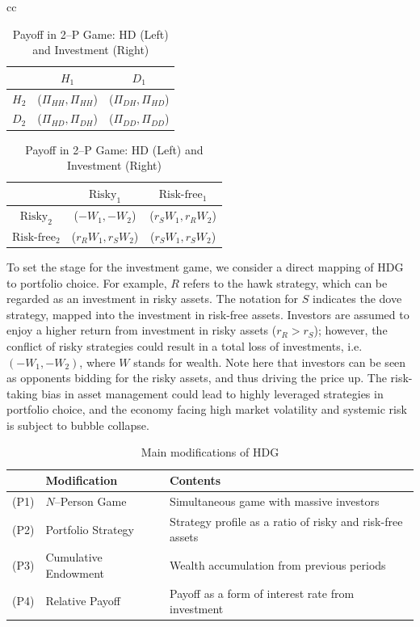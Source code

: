 \documentclass[11pt,a4paper]{article}
\begin{document}
\begin{table}[hbt!]
       \centering
	\caption{Payoff in 2--P Game: HD (Left) and Investment (Right)}
	\begin{tabular}{ cc }   %
		\begin{tabular}{c|cc}
			\toprule
				    & $H_1$ & $D_1$ \\
			\midrule
			$H_2$	& ($\Pi_{HH}, \Pi_{HH}$) & ($\Pi_{DH}, \Pi_{HD}$)\\
			$D_2$	& ($\Pi_{HD}, \Pi_{DH}$) & ($\Pi_{DD},\Pi_{DD}$)\\
			\bottomrule
		\end{tabular} 
		\quad \quad \quad 
		\begin{tabular}{c|cc}
			\toprule
				                & $\mbox{Risky}_1$ & $\mbox{Risk-free}_1$ \\
			\midrule
			$\mbox{Risky}_2$	    & ($-W_{1}, -W_{2}$) & ($r_{S}W_{1}, r_{R}W_{2}$)\\
			$\mbox{Risk-free}_2$	& ($r_{R}W_{1}, r_{S}W_{2}$) & ($r_{S}W_{1}, r_{S}W_{2}$)\\
			\bottomrule
		\end{tabular}
	\end{tabular}
       \label{tab:2p_payoff}
\end{table}

To set the stage for the investment game, we consider a direct mapping of HDG to portfolio choice. For example, $R$ refers to the hawk strategy, which can be regarded as an investment in risky assets. The notation for $S$ indicates the dove strategy, mapped into the investment in risk-free assets. Investors are assumed to enjoy a higher return from investment in risky assets ($r_{R} > r_{S}$); however, the conflict of risky strategies could result in a total loss of investments, i.e. $(-W_{1}, -W_{2})$, where $W$ stands for wealth. Note here that investors can be seen as opponents bidding for the risky assets, and thus driving the price up. The risk-taking  bias in asset management could lead to highly leveraged strategies in portfolio choice, and the economy facing high market volatility and systemic risk is subject to bubble collapse. \\

\begin{table}[hbt!]
       \centering
       \caption{Main modifications of HDG}
       \label{tab:sumary}
       \begin{tabular}{llp{.4\linewidth}}
           \toprule
                & \textbf{Modification} & \textbf{Contents}\\
           \midrule
           (P1) & $N$--Person Game       &  Simultaneous game with massive investors \\
           (P2) & Portfolio Strategy    &  Strategy profile as a ratio of risky and risk-free assets \\
           (P3) & Cumulative Endowment  &  Wealth accumulation from previous periods \\
           (P4) & Relative Payoff       &  Payoff as a form of interest rate from investment  \\   
           \bottomrule
       \end{tabular}
\end{table}
\end{document}

